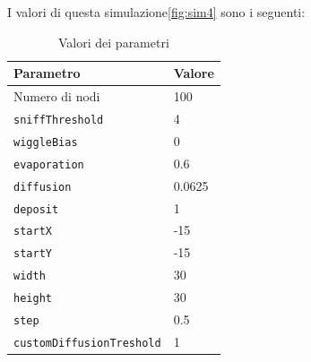 I valori di questa simulazione\space \cref{fig:sim4} sono i seguenti:
\begin{table}[ht]
    \centering
    \caption{Valori dei parametri}
    \begin{tabular}{ll}
        \hline
        Parametro                   & Valore \\
        \hline
        Numero di nodi              & 100    \\
        \texttt{sniffThreshold}     & 4      \\
        \texttt{wiggleBias}         & 0      \\
        \texttt{evaporation}        & 0.6    \\
        \texttt{diffusion}          & 0.0625 \\
        \texttt{deposit}            & 1      \\
        \texttt{startX}             & -15    \\
        \texttt{startY}             & -15    \\
        \texttt{width}              & 30     \\
        \texttt{height}             & 30     \\
        \texttt{step}               & 0.5    \\
        \texttt{customDiffusionTreshold} & 1 \\
        \hline
    \end{tabular}\label{tab:parametri4}
\end{table}

